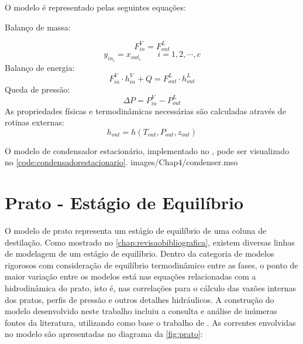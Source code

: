 O modelo é representado pelas seguintes equações:

\begin{flushleft}
Balanço de massa:
\end{flushleft}
\begin{equation}
F_{in}^V = F_{out}^L
\end{equation}
\begin{equation}
y_{in_i} = x_{out_i}  \qquad i=1,2,\cdots,c
\end{equation}
Balanço de energia:
\begin{equation}
F_{in}^V \cdot h_{in}^V + Q = F_{out}^L \cdot h_{out}^L 
\end{equation}
Queda de pressão:
\begin{equation}
\Delta P = P_{in}^V - P_{out}^L
\end{equation}
As propriedades físicas e termodinâmicas necessárias são calculadas através de rotinas externas:
\begin{equation}
h_{out} = h(T_{out}, P_{out}, z_{out})
\end{equation}

O modelo de condensador estacionário, implementado no \emso , pode ser visualizado no
\autoref{code:condensadorestacionario}.
 {images/Chap4/condenser.mso}

\section{Prato - Estágio de Equilíbrio} \label{sec:modeloprato}
O modelo de prato representa um estágio de equilíbrio de uma coluna de destilação. Como mostrado no
\autoref{chap:revisaobibliografica}, existem diversas linhas de modelagem de um estágio de equilíbrio.
Dentro da categoria de modelos rigorosos com consideração de equilíbrio termodinâmico entre as fases, o
ponto de maior variação entre os modelos está nas equações relacionadas com a hidrodinâmica do prato,
isto é, nas correlações para o cálculo das vazões internas dos pratos, perfis de pressão e outros
detalhes hidráulicos.
A construção do modelo desenvolvido neste trabalho incluiu a consulta e análise
de inúmeras fontes da literatura, utilizando como base o
trabalho de .
As correntes envolvidas no modelo são apresentadas no diagrama da
\autoref{fig:prato}:

